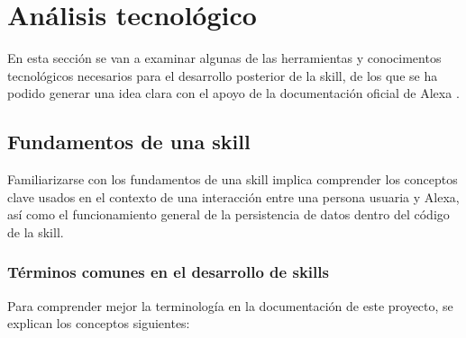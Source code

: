 \section{Análisis tecnológico}

En esta sección se van a examinar algunas de las herramientas y conocimentos tecnológicos necesarios para el desarrollo posterior de la skill, de los que se ha podido generar una idea clara con el apoyo de la documentación oficial de Alexa \parencite{alexaDocs}.

\subsection{Fundamentos de una skill}

Familiarizarse con los fundamentos de una skill implica comprender los conceptos clave usados en el contexto de una interacción entre una persona usuaria y Alexa, así como el funcionamiento general de la persistencia de datos dentro del código de la skill.

\subsubsection{Términos comunes en el desarrollo de skills}

Para comprender mejor la terminología en la documentación de este proyecto, se explican los conceptos siguientes:

